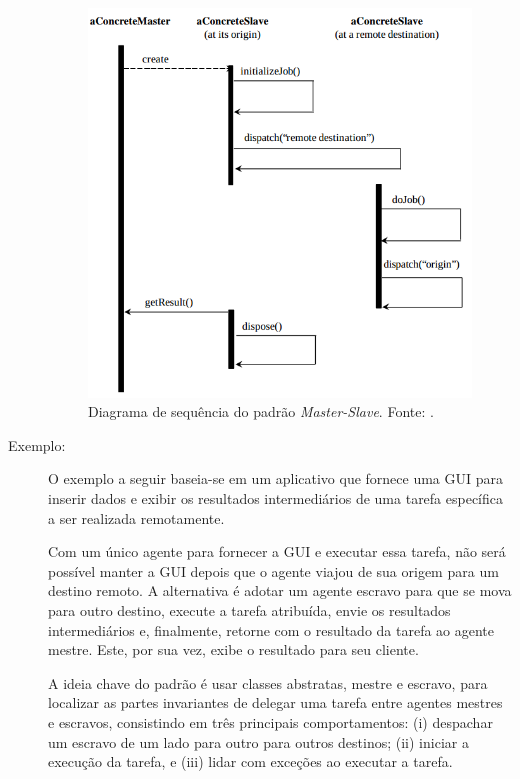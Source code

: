 \begin{description}
\begin{figure}[h!]
    \centering
    \includegraphics[scale=0.4]{figuras/master_slave/diagrama_sequencia.png}
    \caption{Diagrama de sequência do padrão \textit{Master-Slave}. Fonte: .}
    \label{fig:master_sl_diagrama_sequencia}
\end{figure}



    \item[Exemplo:] O exemplo a seguir baseia-se em um aplicativo que fornece uma GUI para inserir dados e exibir os resultados intermediários de uma tarefa específica a ser realizada remotamente.

Com um único agente para fornecer a GUI e executar essa tarefa, não será possível manter a GUI depois que o agente viajou de sua origem para um destino remoto. A alternativa é adotar um agente escravo para que se mova para outro destino, execute a tarefa atribuída, envie os resultados intermediários e, finalmente, retorne com o resultado da tarefa ao agente mestre. Este, por sua vez, exibe o resultado para seu cliente.

A ideia chave do padrão é usar classes abstratas, mestre e escravo, para localizar as partes invariantes de delegar uma tarefa entre agentes mestres e escravos, consistindo em três principais comportamentos: (i) despachar um escravo de um lado para outro para outros destinos; (ii) iniciar a execução da tarefa, e (iii) lidar com exceções ao executar a tarefa.


\end{description}
